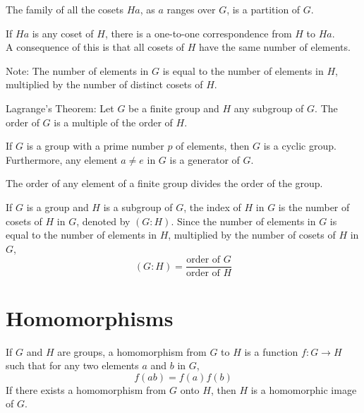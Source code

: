 \documentclass[12pt]{article}
\begin{document}
\begin{theorem} The family of all the cosets $Ha$, as $a$ ranges over $G$, is a partition of $G$. \end{theorem} 

\begin{theorem} If $Ha$ is any coset of $H$, there is a one-to-one correspondence from $H$ to $Ha$. \\ A consequence of this is that all cosets of $H$ have the same number of elements. \end{theorem} 

Note: The number of elements in $G$ is equal to the number of elements in $H$, multiplied by the number of distinct cosets of $H$. 

\begin{theorem} Lagrange's Theorem: Let $G$ be a finite group and $H$ any subgroup of $G$. The order of $G$ is a multiple of the order of $H$. \end{theorem} 

\begin{theorem} If $G$ is a group with a prime number $p$ of elements, then $G$ is a cyclic group. Furthermore, any element $a \neq e$ in $G$ is a generator of $G$. \end{theorem} 

\begin{theorem} The order of any element of a finite group divides the order of the group. \end{theorem} 

\begin{definition} If $G$ is a group and $H$ is a subgroup of $G$, the index of $H$ in $G$ is the number of cosets of $H$ in $G$, denoted by  $(G:H)$. Since the number of elements in $G$ is equal to the number of elements in $H$, multiplied by the number of cosets of $H$ in $G$, $$(G:H) = \frac{\text{order of }G}{\text{order of }H}$$ \end{definition} 

\section{Homomorphisms}

\begin{definition} If $G$ and $H$ are groups, a homomorphism from $G$ to $H$ is a function $f: G \to H$ such that for any two elements $a$ and $b$ in $G$, $$f(ab) = f(a)f(b)$$ If there exists a homomorphism from $G$ onto $H$, then $H$ is a homomorphic image of $G$. \end{definition} 
\end{document}
